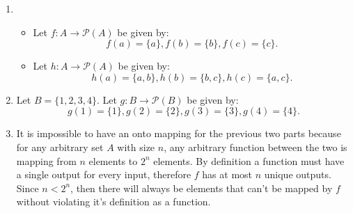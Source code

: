 \documentclass[12pt, letterpaper]{article}
\newcommand{\Po}{\mathcal{P}}
\begin{document}
\begin{enumerate}
\begin{enumerate}
		\item 
		\begin{itemize}
			\item Let $f: A \to \Po (A)$ be given by:
			$$
				f(a) = \{a\}, f(b) = \{b\}, f(c) = \{c\}.
			$$
			\item Let $h: A \to \Po (A)$ be given by:
			$$
			h(a) = \{a,b\}, h(b) = \{b,c\}, h(c) = \{a,c\}.
			$$
		\end{itemize}
		\item Let $B = \{1,2,3,4\}$.  Let $g: B \to \Po(B)$ be given by:
		$$
		g(1) = \{1\}, g(2) = \{2\}, g(3) = \{3\}, g(4) = \{4\}.
		$$
		\item It is impossible to have an onto mapping for the previous two parts because for any arbitrary set $A$ with size $n$, any arbitrary function between the two is mapping from $n$ elements to $2^n$ elements.  By definition a function must have a single output for every input, therefore $f$ has at most $n$ unique outputs.  Since $n < 2^n$, then there will always be elements that can't be mapped by $f$ without violating it's definition as a function.  
	\end{enumerate}
\end{enumerate}
\end{document}
